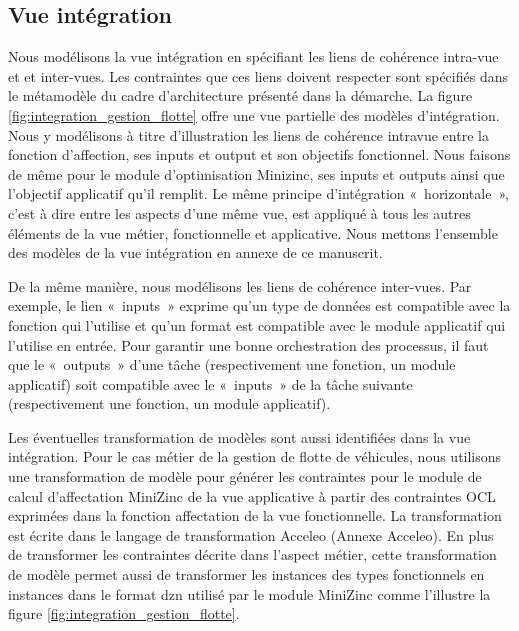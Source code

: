 \subsection{Vue intégration}

Nous modélisons la vue intégration en spécifiant les liens de cohérence  intra-vue et et inter-vues. Les contraintes que ces liens doivent respecter sont spécifiés dans le métamodèle du cadre d'architecture présenté dans la démarche. La figure \ref{fig:integration_gestion_flotte} offre une vue partielle des modèles d'intégration. Nous y modélisons à titre d'illustration les liens de cohérence intravue entre la fonction d'affection, ses inputs et output et son objectifs fonctionnel. Nous faisons de même pour le module d'optimisation Minizinc, ses inputs et outputs ainsi que l'objectif applicatif qu'il remplit. Le même principe d'intégration «~horizontale~», c'est à dire entre les aspects d'une même vue, est appliqué à tous les autres éléments de la vue métier, fonctionnelle et applicative. Nous mettons l'ensemble des modèles de la vue intégration en annexe de ce manuscrit. 

De la même manière, nous modélisons les liens de cohérence inter-vues. Par exemple, le lien «~inputs~» exprime qu'un type de données est compatible avec la fonction qui l'utilise et qu'un format est compatible avec le module applicatif qui l'utilise en entrée. Pour garantir une bonne orchestration des processus, il faut que le «~outputs~» d'une tâche (respectivement une fonction, un module applicatif) soit compatible avec le «~inputs~» de la tâche suivante (respectivement une fonction, un module applicatif).

Les éventuelles transformation de modèles sont aussi identifiées dans la vue intégration. Pour le cas métier de la gestion de flotte de véhicules, nous utilisons une transformation de modèle pour générer les contraintes pour le module de calcul d'affectation MiniZinc de la vue applicative à partir des contraintes OCL exprimées dans la fonction affectation de la vue fonctionnelle. La transformation est écrite dans le langage de transformation Acceleo (Annexe Acceleo). En plus de transformer les contraintes décrite dans l'aspect métier, cette transformation de modèle permet aussi de transformer les instances des types fonctionnels en instances dans le format dzn utilisé par le module MiniZinc comme l'illustre la figure \ref{fig:integration_gestion_flotte}. 

